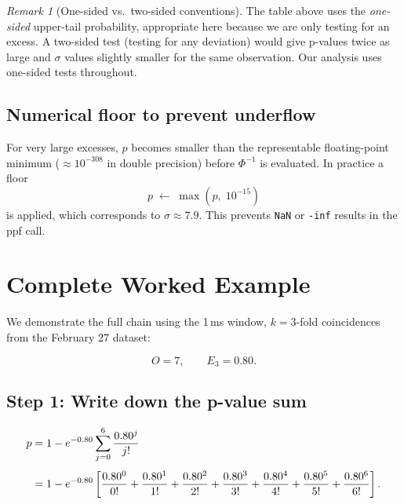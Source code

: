 \documentclass[12pt]{article}
\theoremstyle{definition}
\theoremstyle{remark}
\newtheorem{remark}{Remark}
\newcommand{\obs}{O}
\newcommand{\Eacc}{E}
\newcommand{\nsig}{\sigma}
\begin{document}
\begin{remark}[One-sided vs.\ two-sided conventions]
  The table above uses the \emph{one-sided} upper-tail probability,
  appropriate here because we are only testing for an excess.  A
  two-sided test (testing for any deviation) would give p-values twice
  as large and $\nsig$ values slightly smaller for the same observation.
  Our analysis uses one-sided tests throughout.
\end{remark}

\subsection{Numerical floor to prevent underflow}

For very large excesses, $p$ becomes smaller than the representable
floating-point minimum ($\approx 10^{-308}$ in double precision) before
$\Phi^{-1}$ is evaluated.  In practice a floor
\begin{equation}
  p \;\gets\; \max\!\left(p,\; 10^{-15}\right)
  \label{eq:floor}
\end{equation}
is applied, which corresponds to $\nsig \approx 7.9$.  This prevents
\texttt{NaN} or \texttt{-inf} results in the ppf call.

\section{Complete Worked Example}
\label{sec:example}

We demonstrate the full chain using the 1\,ms window, $k = 3$-fold
coincidences from the February 27 dataset:

\[
  \obs = 7, \qquad \Eacc_3 = 0.80.
\]

\subsection{Step 1: Write down the p-value sum}

\begin{align}
  p &= 1 - e^{-0.80}\sum_{j=0}^{6}\frac{0.80^{j}}{j!} \notag \\[4pt]
    &= 1 - e^{-0.80}\left[
        \frac{0.80^0}{0!}
        + \frac{0.80^1}{1!}
        + \frac{0.80^2}{2!}
        + \frac{0.80^3}{3!}
        + \frac{0.80^4}{4!}
        + \frac{0.80^5}{5!}
        + \frac{0.80^6}{6!}
      \right].
  \label{eq:ex-sum}
\end{align}
\end{document}
